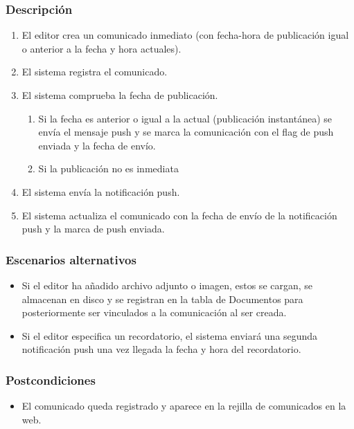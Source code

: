 \subsubsection*{Descripción}

\begin{enumerate}
    \item El editor crea un comunicado inmediato (con fecha-hora de publicación igual o anterior a la fecha y hora actuales).
    \item El sistema registra el comunicado.
    \item El sistema comprueba la fecha de publicación.
    \begin{enumerate}
        \item Si la fecha es anterior o igual a la actual (publicación instantánea) se envía el mensaje push y se marca la comunicación con el flag de push enviada y la fecha de envío.
        \item Si la publicación no es inmediata
    \end{enumerate}
    \item El sistema envía la notificación push.
    \item El sistema actualiza el comunicado con la fecha de envío de la notificación push y la marca de push enviada.
\end{enumerate}

\subsubsection*{Escenarios alternativos}
\begin{itemize}
    \item Si el editor ha añadido archivo adjunto o imagen, estos se cargan, se almacenan en disco y se registran en la tabla de Documentos para posteriormente ser vinculados a la comunicación al ser creada.
    \item Si el editor especifica un recordatorio, el sistema enviará una segunda notificación push una vez llegada la fecha y hora del recordatorio.
\end{itemize}

\subsubsection*{Postcondiciones}
\begin{itemize}
    \item El comunicado queda registrado y aparece en la rejilla de comunicados en la web.
\end{itemize}